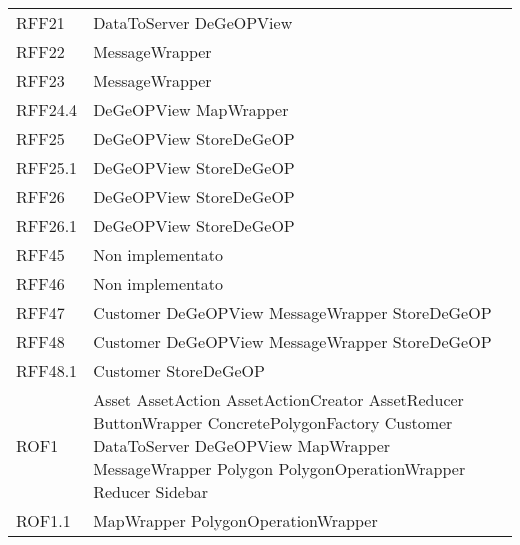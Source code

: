 \begin{longtable}{p{2.5cm}!{\VRule[1pt]}p{5cm}}
	RFF21 & DataToServer \newline DeGeOPView\\
	RFF22 & MessageWrapper\\
	RFF23 & MessageWrapper\\
	RFF24.4 & DeGeOPView \newline MapWrapper\\
	RFF25 & DeGeOPView \newline StoreDeGeOP\\
	RFF25.1 & DeGeOPView \newline StoreDeGeOP\\
	RFF26 & DeGeOPView \newline StoreDeGeOP\\
	RFF26.1 & DeGeOPView \newline StoreDeGeOP\\
	RFF45 & Non implementato\\
	RFF46 & Non implementato\\
	RFF47 & Customer \newline DeGeOPView \newline MessageWrapper \newline StoreDeGeOP\\
	RFF48 & Customer \newline DeGeOPView \newline MessageWrapper \newline StoreDeGeOP\\
	RFF48.1 & Customer \newline StoreDeGeOP\\
	ROF1 & Asset \newline AssetAction \newline AssetActionCreator \newline AssetReducer \newline ButtonWrapper \newline ConcretePolygonFactory \newline Customer \newline DataToServer \newline DeGeOPView \newline MapWrapper \newline MessageWrapper \newline Polygon \newline PolygonOperationWrapper \newline Reducer \newline Sidebar\\
	ROF1.1 & MapWrapper \newline PolygonOperationWrapper\\

\end{longtable}
